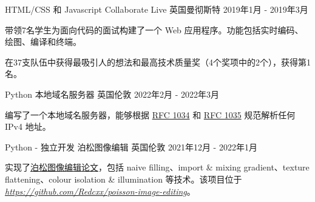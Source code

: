 \begin{cventries}
\cventry
{HTML/CSS 和 Javascript} %
{Collaborate Live} %
{英国曼彻斯特} %
{2019年1月 - 2019年3月} %
{
  \begin{cvitems} %
    \item {带领7名学生为面向代码的面试构建了一个 Web 应用程序。功能包括实时编码、绘图、编译和终端。}
    \item {在37支队伍中获得最吸引人的想法和最高技术质量奖（4个奖项中的2个），获得第1名。}
  \end{cvitems}
}

\cventry
{Python} %
{本地域名服务器} %
{英国伦敦} %
{2022年2月 - 2022年3月} %
{
\begin{cvitems} %
\item {编写了一个本地域名服务器，能够根据 \href{https://datatracker.ietf.org/doc/html/rfc1034}{RFC 1034} 和 \href{https://datatracker.ietf.org/doc/html/rfc1035}{RFC 1035} 规范解析任何 IPv4 地址。}
\end{cvitems}
}

\cventry
{Python - 独立开发} %
{泊松图像编辑} %
{英国伦敦} %
{2021年12月 - 2022年1月} %
{
\begin{cvitems} %
\item {实现了\href{https://www.cs.jhu.edu/~misha/Fall07/Papers/Perez03.pdf}{泊松图像编辑论文}，包括 naive filling、import \& mixing gradient、texture flattening、colour isolation \& illumination 等技术。该项目位于 \href{https://github.com/Redcxx/poisson-image-editing}{\textit{https://github.com/Redcxx/poisson-image-editing}}。}
\end{cvitems}
}

\end{cventries}

